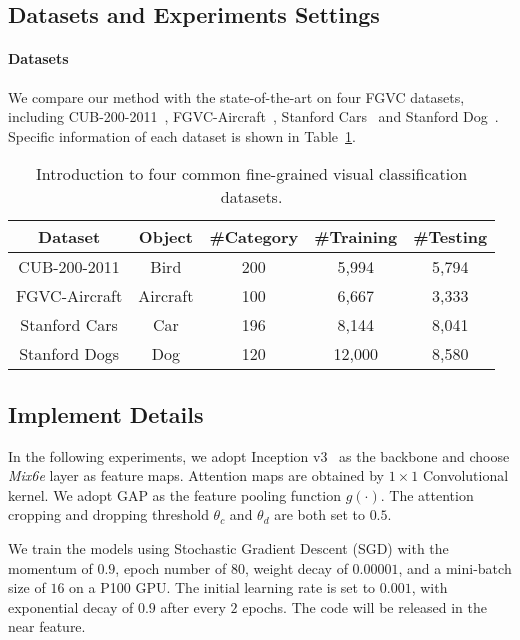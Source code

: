 \documentclass[10pt,twocolumn,letterpaper]{article}
\begin{document}
\subsection{Datasets and Experiments Settings}
\paragraph{Datasets} We compare our method with the state-of-the-art on four FGVC datasets, including CUB-200-2011~\cite{CUB_200_2011}, FGVC-Aircraft~\cite{fgvc_aircraft}, Stanford Cars~\cite{Stanford_car} and Stanford Dog~\cite{stanford_dog}. Specific information of each dataset is shown in Table~\ref{tab:dataset}.

\begin{table}[h]
    \begin{center}
        \scriptsize
        \begin{tabular}{c|c|c|c|c}
            \hline
            Dataset & Object & \#Category & \#Training & \#Testing\\
            \hline
            CUB-200-2011 & Bird & 200 & 5,994 & 5,794  \\
            \hline
            FGVC-Aircraft & Aircraft & 100 & 6,667 & 3,333\\
            \hline
            Stanford Cars & Car & 196 & 8,144 & 8,041 \\
            \hline
            Stanford Dogs & Dog & 120 & 12,000 & 8,580 \\
            \hline
        \end{tabular}
    \end{center}
    \caption {Introduction to four common fine-grained visual classification datasets.}
    \label{tab:dataset}
\end{table}


\subsection{Implement Details}
In the following experiments, we adopt Inception v3~\cite{inception} as the backbone and choose \textit{Mix6e} layer as feature maps. Attention maps are obtained by $1 \times 1$ Convolutional kernel. We adopt GAP as the feature pooling function $g(\cdot)$. The attention cropping and dropping threshold $\theta_c$ and $\theta_d$ are both set to $0.5$.

We train the models using Stochastic Gradient Descent (SGD) with the momentum of $0.9$, epoch number of $80$, weight decay of $0.00001$, and a mini-batch size of $16$ on a P100 GPU. The initial learning rate is set to $0.001$, with exponential decay of $0.9$ after every $2$ epochs. The code will be released in the near feature.
\end{document}
